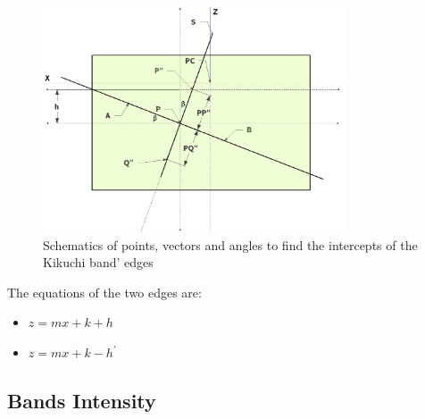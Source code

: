 \documentclass[letterpaper]{article}
\begin{document}
	\begin{figure}
		\centering
		\includegraphics[width=0.8\textwidth]{figures/widthangle4}
		\caption{Schematics of points, vectors and angles to find the intercepts of the Kikuchi band' edges}
		\label{fig:widthangle4}
	\end{figure}
	
	The equations of the two edges are:
	\begin{itemize}
		\item $z = mx + k + h$
		\item $z = mx + k - h^\prime$
	\end{itemize}
	
	\subsection{Bands Intensity}
	
	
\end{document}

